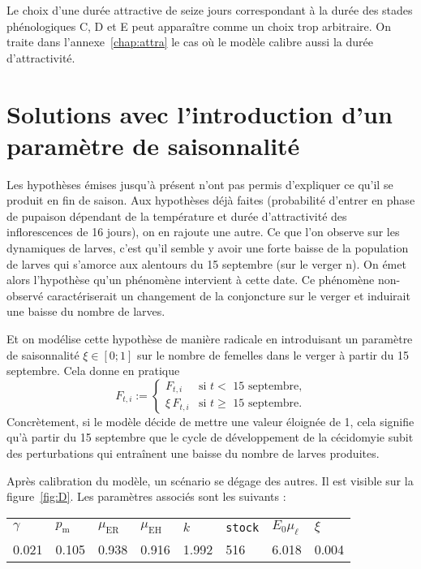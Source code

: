 Le choix d'une durée attractive de seize jours correspondant à la durée des stades phénologiques C, D et E peut apparaître comme un choix trop arbitraire.
On traite dans l'annexe~\ref{chap:attra} le cas où le modèle calibre aussi la durée d'attractivité.

\clearpage
\section{Solutions avec l'introduction d'un paramètre de saisonnalité}

Les hypothèses émises jusqu'à présent n'ont pas permis d'expliquer ce qu'il se produit en fin de saison.
Aux hypothèses déjà faites (probabilité d'entrer en phase de pupaison dépendant de la température et durée d'attractivité des inflorescences de 16 jours), on en rajoute une autre.
Ce que l'on observe sur les dynamiques de larves, c'est qu'il semble y avoir une forte baisse de la population de larves qui s'amorce aux alentours du 15 septembre (sur le verger n).
On émet alors l'hypothèse qu'un phénomène intervient à cette date.
Ce phénomène non-observé caractériserait un changement de la conjoncture sur le verger et induirait une baisse du nombre de larves.

Et on modélise cette hypothèse de manière radicale en introduisant un paramètre de saisonnalité $\xi \in [0;1]$ sur le nombre de femelles dans le verger à partir du 15 septembre.
Cela donne en pratique
\[
F_{t,i} := \begin{cases}
            F_{t, i} & \text{si $t<$ 15 septembre,}\\
            \xi \, F_{t, i} & \text{si $t\geq$ 15 septembre.}
           \end{cases}
\]
Concrètement, si le modèle décide de mettre une valeur éloignée de 1, cela signifie qu'à partir du 15 septembre que le cycle de développement de la cécidomyie subit des perturbations qui entraînent une baisse du nombre de larves produites.

Après calibration du modèle, un scénario se dégage des autres.
Il est visible sur la figure~\ref{fig:D}.
Les paramètres associés sont les suivants :
\begin{center}
\begin{tabular}{llllllll}
$\gamma$ & $p_{\text{m}}$ & $\mu_{\text{ER}}$ & $\mu_{\text{EH}}$ & $k$ & \texttt{stock} & $E_0\mu_{\ell}$ & $\xi$\\
0.021 & 0.105 & 0.938 & 0.916 & 1.992 & 516 & 6.018 & 0.004
\end{tabular}
\end{center}


